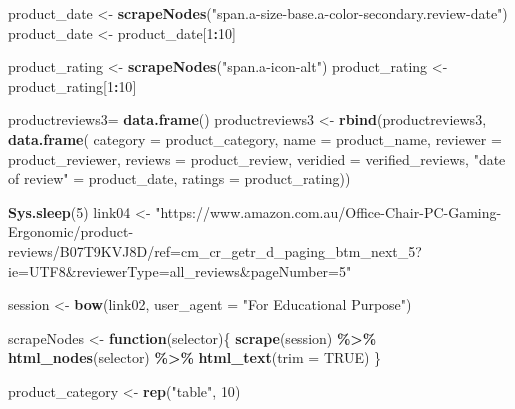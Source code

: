 \documentclass[
]{article}
\newenvironment{Shaded}{\begin{snugshade}}{\end{snugshade}}
\newcommand{\AttributeTok}[1]{\textcolor[rgb]{0.13,0.29,0.53}{#1}}
\newcommand{\ConstantTok}[1]{\textcolor[rgb]{0.56,0.35,0.01}{#1}}
\newcommand{\ControlFlowTok}[1]{\textcolor[rgb]{0.13,0.29,0.53}{\textbf{#1}}}
\newcommand{\DecValTok}[1]{\textcolor[rgb]{0.00,0.00,0.81}{#1}}
\newcommand{\FunctionTok}[1]{\textcolor[rgb]{0.13,0.29,0.53}{\textbf{#1}}}
\newcommand{\NormalTok}[1]{#1}
\newcommand{\OtherTok}[1]{\textcolor[rgb]{0.56,0.35,0.01}{#1}}
\newcommand{\SpecialCharTok}[1]{\textcolor[rgb]{0.81,0.36,0.00}{\textbf{#1}}}
\newcommand{\StringTok}[1]{\textcolor[rgb]{0.31,0.60,0.02}{#1}}
\begin{document}
\begin{Shaded}
\begin{Highlighting}[]
\NormalTok{  product\_date }\OtherTok{\textless{}{-}} \FunctionTok{scrapeNodes}\NormalTok{(}\StringTok{"span.a{-}size{-}base.a{-}color{-}secondary.review{-}date"}\NormalTok{)}
\NormalTok{  product\_date }\OtherTok{\textless{}{-}}\NormalTok{ product\_date[}\DecValTok{1}\SpecialCharTok{:}\DecValTok{10}\NormalTok{]}
  
\NormalTok{  product\_rating }\OtherTok{\textless{}{-}} \FunctionTok{scrapeNodes}\NormalTok{(}\StringTok{"span.a{-}icon{-}alt"}\NormalTok{)}
\NormalTok{  product\_rating }\OtherTok{\textless{}{-}}\NormalTok{ product\_rating[}\DecValTok{1}\SpecialCharTok{:}\DecValTok{10}\NormalTok{]}
  
\NormalTok{  productreviews3}\OtherTok{=} \FunctionTok{data.frame}\NormalTok{()}
\NormalTok{  productreviews3 }\OtherTok{\textless{}{-}} \FunctionTok{rbind}\NormalTok{(productreviews3, }\FunctionTok{data.frame}\NormalTok{(}
                      \AttributeTok{category =}\NormalTok{ product\_category,}
                      \AttributeTok{name =}\NormalTok{ product\_name,}
                      \AttributeTok{reviewer =}\NormalTok{ product\_reviewer,}
                      \AttributeTok{reviews =}\NormalTok{ product\_review,}
                      \AttributeTok{veridied =}\NormalTok{ verified\_reviews,}
                      \StringTok{"date of review"} \OtherTok{=}\NormalTok{ product\_date,}
                      \AttributeTok{ratings =}\NormalTok{ product\_rating))}
  
   \FunctionTok{Sys.sleep}\NormalTok{(}\DecValTok{5}\NormalTok{)}
\NormalTok{link04 }\OtherTok{\textless{}{-}} \StringTok{"https://www.amazon.com.au/Office{-}Chair{-}PC{-}Gaming{-}Ergonomic/product{-}reviews/B07T9KVJ8D/ref=cm\_cr\_getr\_d\_paging\_btm\_next\_5?ie=UTF8\&reviewerType=all\_reviews\&pageNumber=5"}


\NormalTok{  session }\OtherTok{\textless{}{-}} \FunctionTok{bow}\NormalTok{(link02,}
               \AttributeTok{user\_agent =} \StringTok{"For Educational Purpose"}\NormalTok{)}

\NormalTok{  scrapeNodes }\OtherTok{\textless{}{-}} \ControlFlowTok{function}\NormalTok{(selector)\{}
    \FunctionTok{scrape}\NormalTok{(session) }\SpecialCharTok{\%\textgreater{}\%}
      \FunctionTok{html\_nodes}\NormalTok{(selector) }\SpecialCharTok{\%\textgreater{}\%}
      \FunctionTok{html\_text}\NormalTok{(}\AttributeTok{trim =} \ConstantTok{TRUE}\NormalTok{)}
\NormalTok{  \}}

\NormalTok{  product\_category }\OtherTok{\textless{}{-}} \FunctionTok{rep}\NormalTok{(}\StringTok{"table"}\NormalTok{, }\DecValTok{10}\NormalTok{)}


\end{Highlighting}
\end{Shaded}
\end{document}

